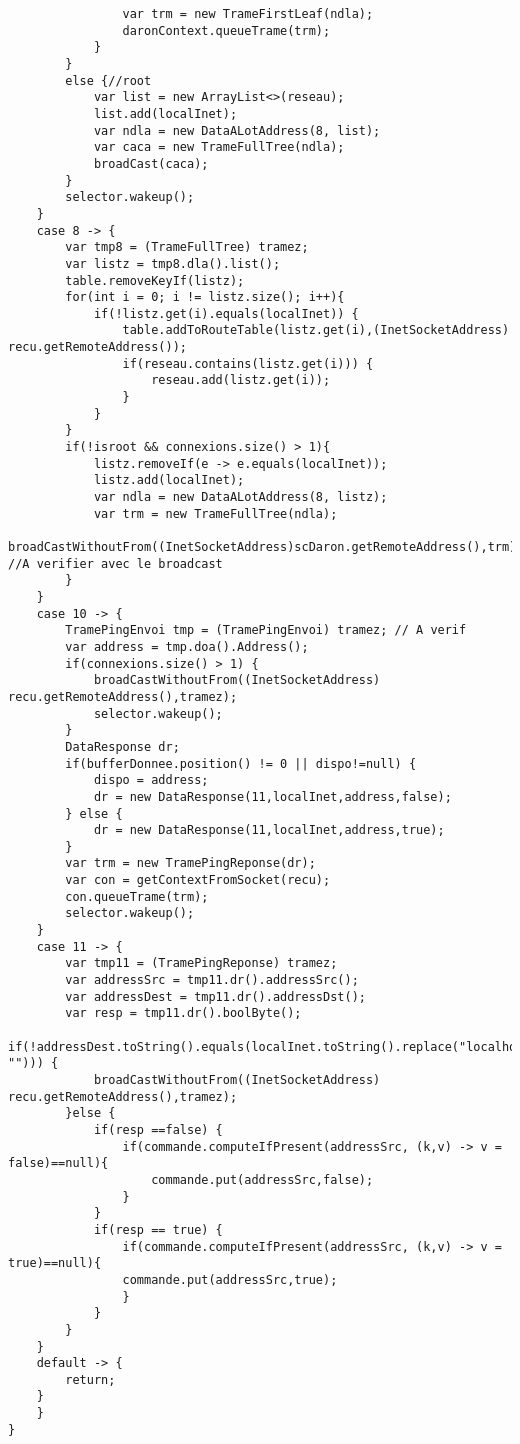 \documentclass[a4paper,titlepage]{report}
\begin{document}
\begin{lstlisting}
				var trm = new TrameFirstLeaf(ndla);
				daronContext.queueTrame(trm);
			}	
		}
		else {//root
			var list = new ArrayList<>(reseau);
			list.add(localInet);
			var ndla = new DataALotAddress(8, list);
			var caca = new TrameFullTree(ndla);
			broadCast(caca);
		}
		selector.wakeup();
	}
	case 8 -> {
		var tmp8 = (TrameFullTree) tramez;
		var listz = tmp8.dla().list();
		table.removeKeyIf(listz);
		for(int i = 0; i != listz.size(); i++){
			if(!listz.get(i).equals(localInet)) {
				table.addToRouteTable(listz.get(i),(InetSocketAddress) recu.getRemoteAddress());		
				if(reseau.contains(listz.get(i))) {
					reseau.add(listz.get(i));
				}
			}		
		}
		if(!isroot && connexions.size() > 1){
			listz.removeIf(e -> e.equals(localInet));
			listz.add(localInet);
			var ndla = new DataALotAddress(8, listz);
			var trm = new TrameFullTree(ndla);
			broadCastWithoutFrom((InetSocketAddress)scDaron.getRemoteAddress(),trm); //A verifier avec le broadcast
		}
	}
	case 10 -> {
		TramePingEnvoi tmp = (TramePingEnvoi) tramez; // A verif
		var address = tmp.doa().Address();
		if(connexions.size() > 1) {
			broadCastWithoutFrom((InetSocketAddress) recu.getRemoteAddress(),tramez);
			selector.wakeup();
		}
		DataResponse dr;
		if(bufferDonnee.position() != 0 || dispo!=null) {
			dispo = address;
			dr = new DataResponse(11,localInet,address,false);
		} else {
			dr = new DataResponse(11,localInet,address,true);
		}
		var trm = new TramePingReponse(dr);
		var con = getContextFromSocket(recu);
		con.queueTrame(trm);
		selector.wakeup();	
	}
	case 11 -> {
		var tmp11 = (TramePingReponse) tramez;
		var addressSrc = tmp11.dr().addressSrc();
		var addressDest = tmp11.dr().addressDst();
		var resp = tmp11.dr().boolByte();		
		if(!addressDest.toString().equals(localInet.toString().replace("localhost", ""))) {
			broadCastWithoutFrom((InetSocketAddress) recu.getRemoteAddress(),tramez);
		}else {
			if(resp ==false) {
				if(commande.computeIfPresent(addressSrc, (k,v) -> v = false)==null){
					commande.put(addressSrc,false);
				}
			}
			if(resp == true) {
				if(commande.computeIfPresent(addressSrc, (k,v) -> v = true)==null){
				commande.put(addressSrc,true);
				}
			}
		}				
	}
	default -> {
		return;
	}
	}
}
\end{lstlisting}
\pagebreak
\end{document}
